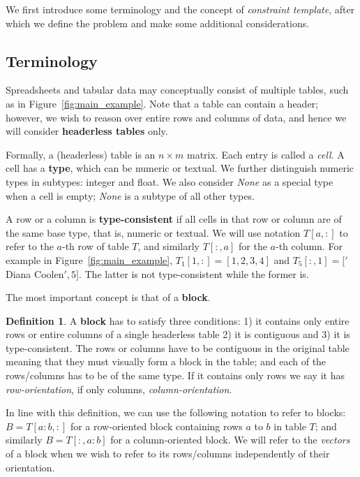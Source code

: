 \documentclass{IEEEtran}
\newcommand{\format}[1]{\textit{#1}\xspace}
\newcommand{\template}{\format{constraint template}}
\newcommand{\rangeto}[2]{#1{:}#2}
\theoremstyle{definition}
\newtheorem{definition}{Definition}
\begin{document}

We first introduce some terminology and the concept of \template, after which we define the problem and make some additional considerations.

\subsection{Terminology}
Spreadsheets and tabular data may conceptually consist of multiple tables, such as in Figure~\ref{fig:main_example}. Note that a table can contain a header; however, we wish to reason over entire rows and columns of data, and hence we will consider \textbf{headerless tables} only.

Formally, a (headerless) table is an $n \times m$ matrix. Each entry is called a \textit{cell}.
A cell has a {\bf type}, which can be numeric or textual. We further distinguish numeric types in subtypes: integer and float. We also consider \textit{None} as a special type when a cell is empty; \textit{None} is a subtype of all other types.

A row or a column is \textbf{type-consistent} if all cells in that row or column are of the same base type, that is, numeric or textual. We will use notation $T[a,{:}]$ to refer to the $a$-th row of table $T$, and similarly $T[{:},a]$ for the $a$-th column. For example in Figure~\ref{fig:main_example}, $T_1[1,:] = [1,2,3,4]$ and $T_5[:,1] = ['$Diana Coolen$', 5]$. The latter is not type-consistent while the former is.

The most important concept is that of a \textbf{block}. 
\begin{definition}
A \textbf{block} has to satisfy three conditions: 1) it contains only entire rows or entire columns of a single headerless table 2) it is contiguous and 3) it is type-consistent.
The rows or columns have to be contiguous in the original table meaning that they must visually form a block in the table; and each of the rows/columns has to be of the same type. 
If it contains only rows we say it has \textit{row-orientation}, if only columns, \textit{column-orientation}. 
\end{definition}

In line with this definition, we can use the following notation to refer to blocks: $B = T[\rangeto{a}{b},:]$ for a row-oriented block containing rows $a$ to $b$ in table $T$; and similarly $B = T[{:},\rangeto{a}{b}]$ for a column-oriented block.
We will refer to the \textit{vectors} of a block when we wish to refer to its rows/columns independently of their orientation.
\end{document}

